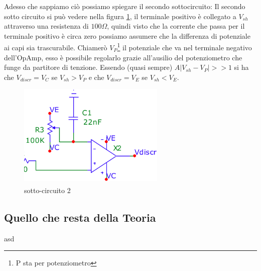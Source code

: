 \documentclass{article}
\begin{document}
			Adesso che sappiamo ciò possiamo spiegare il secondo sottocircuito:
			Il secondo sotto circuito si può vedere nella figura \ref{fig:circ2}, il terminale positivo è collegato a $V_{sh}$ attraverso una resistenza di $100\Omega$, quindi visto che la corrente che passa per il terminale positivo è circa zero possiamo assumere che la differenza di potenziale ai capi sia trascurabile.\newline
			Chiamerò $V_P$\footnote{P sta per potenziometro} il potenziale che va nel terminale negativo dell'OpAmp, esso è possibile regolarlo grazie all'ausilio del potenziometro che funge da partitore di tenzione.\newline
			Essendo (quasi sempre) $A|V_{sh}-V_P|>>1$ si ha che $V_{discr}=V_C$ se $V_{sh}>V_P$ e che $V_{discr}=V_E$ se $V_{sh}<V_E$.
			\begin{figure}
				\label{fig:circ2}
				\centering
				\includegraphics[width=70mm]{immagini/circ2a.png}
				\caption{sotto-circuito 2}
			\end{figure}
		\subsection{Quello che resta della Teoria}
			asd
\end{document}
